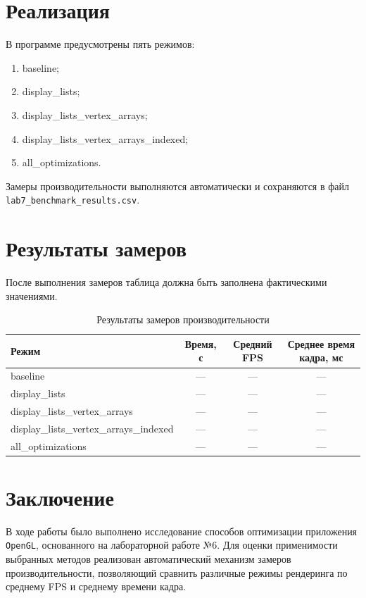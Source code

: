 \documentclass[a4paper, 14pt]{extarticle}
\begin{document}
\section{Реализация}
В программе предусмотрены пять режимов:
\begin{enumerate}
  \item baseline;
  \item display\_lists;
  \item display\_lists\_vertex\_arrays;
  \item display\_lists\_vertex\_arrays\_indexed;
  \item all\_optimizations.
\end{enumerate}

Замеры производительности выполняются автоматически и сохраняются в файл \texttt{lab7\_benchmark\_results.csv}.

\section{Результаты замеров}
После выполнения замеров таблица должна быть заполнена фактическими значениями.

\begin{table}[H]
\centering
\caption{Результаты замеров производительности}
\begin{tabular}{|l|c|c|c|}
\hline
Режим & Время, с & Средний FPS & Среднее время кадра, мс \\
\hline
baseline & --- & --- & --- \\
\hline
display\_lists & --- & --- & --- \\
\hline
display\_lists\_vertex\_arrays & --- & --- & --- \\
\hline
display\_lists\_vertex\_arrays\_indexed & --- & --- & --- \\
\hline
all\_optimizations & --- & --- & --- \\
\hline
\end{tabular}
\end{table}

\section{Заключение}
В ходе работы было выполнено исследование способов оптимизации приложения \texttt{OpenGL}, основанного на лабораторной работе №6. Для оценки применимости выбранных методов реализован автоматический механизм замеров производительности, позволяющий сравнить различные режимы рендеринга по среднему FPS и среднему времени кадра.
\end{document}
